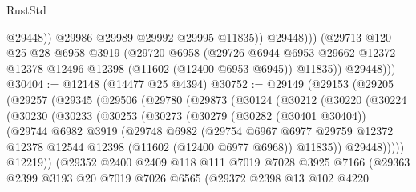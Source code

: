 \begin{lexlean}{RustStd}
\begin{coremodule}
                      @29448))
                  @29986
                  @29989
                  @29992
                  @29995
                  @11835))
              @29448)))
        (@29713
          @120
          @25
          @28
          @6958
          @3919
          (@29720
            @6958
            (@29726
              @6944
              @6953
              @29662
              @12372
              @12378
              @12496
              @12398
              (@11602 (@12400 @6953 @6945))
              @11835))
          @29448)))
@30404 := @12148 (@14477 @25 @4394)
@30752 := @29149
    (@29153
      (@29205
        (@29257
          (@29345
            (@29506
              (@29780
                (@29873
                  (@30124
                    (@30212
                      (@30220
                        (@30224
                          (@30230
                            (@30233
                              (@30253
                                (@30273
                                  (@30279
                                    (@30282 (@30401 @30404))
                                    (@29744
                                      @6982
                                      @3919
                                      (@29748
                                        @6982
                                        (@29754
                                          @6967
                                          @6977
                                          @29759
                                          @12372
                                          @12378
                                          @12544
                                          @12398
                                          (@11602 (@12400 @6977 @6968))
                                          @11835))
                                      @29448)))))
                            @12219))
                        (@29352
                          @2400
                          @2409
                          @118
                          @111
                          @7019
                          @7028
                          @3925
                          @7166
                          (@29363
                            @2399
                            @3193
                            @20
                            @7019
                            @7026
                            @6565
                            (@29372
                              @2398
                              @13
                              @102
                              @4220

\end{coremodule}
\end{lexlean}
